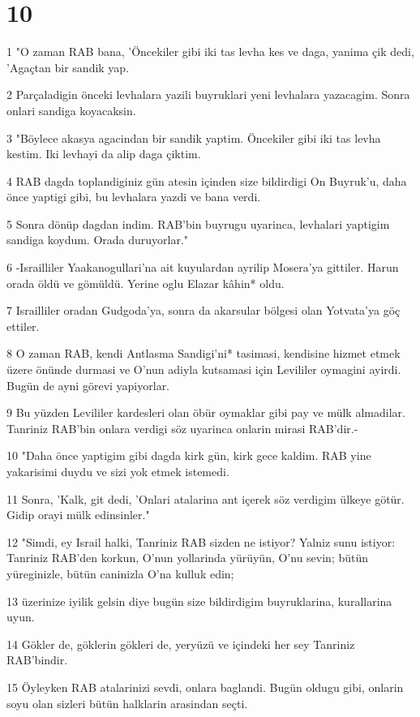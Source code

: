 \chapter{10}

\par 1 "O zaman RAB bana, 'Öncekiler gibi iki tas levha kes ve daga, yanima çik dedi, 'Agaçtan bir sandik yap.
\par 2 Parçaladigin önceki levhalara yazili buyruklari yeni levhalara yazacagim. Sonra onlari sandiga koyacaksin.
\par 3 "Böylece akasya agacindan bir sandik yaptim. Öncekiler gibi iki tas levha kestim. Iki levhayi da alip daga çiktim.
\par 4 RAB dagda toplandiginiz gün atesin içinden size bildirdigi On Buyruk'u, daha önce yaptigi gibi, bu levhalara yazdi ve bana verdi.
\par 5 Sonra dönüp dagdan indim. RAB'bin buyrugu uyarinca, levhalari yaptigim sandiga koydum. Orada duruyorlar."
\par 6 -Israilliler Yaakanogullari'na ait kuyulardan ayrilip Mosera'ya gittiler. Harun orada öldü ve gömüldü. Yerine oglu Elazar kâhin* oldu.
\par 7 Israilliler oradan Gudgoda'ya, sonra da akarsular bölgesi olan Yotvata'ya göç ettiler.
\par 8 O zaman RAB, kendi Antlasma Sandigi'ni* tasimasi, kendisine hizmet etmek üzere önünde durmasi ve O'nun adiyla kutsamasi için Levililer oymagini ayirdi. Bugün de ayni görevi yapiyorlar.
\par 9 Bu yüzden Levililer kardesleri olan öbür oymaklar gibi pay ve mülk almadilar. Tanriniz RAB'bin onlara verdigi söz uyarinca onlarin mirasi RAB'dir.-
\par 10 "Daha önce yaptigim gibi dagda kirk gün, kirk gece kaldim. RAB yine yakarisimi duydu ve sizi yok etmek istemedi.
\par 11 Sonra, 'Kalk, git dedi, 'Onlari atalarina ant içerek söz verdigim ülkeye götür. Gidip orayi mülk edinsinler."
\par 12 "Simdi, ey Israil halki, Tanriniz RAB sizden ne istiyor? Yalniz sunu istiyor: Tanriniz RAB'den korkun, O'nun yollarinda yürüyün, O'nu sevin; bütün yüreginizle, bütün caninizla O'na kulluk edin;
\par 13 üzerinize iyilik gelsin diye bugün size bildirdigim buyruklarina, kurallarina uyun.
\par 14 Gökler de, göklerin gökleri de, yeryüzü ve içindeki her sey Tanriniz RAB'bindir.
\par 15 Öyleyken RAB atalarinizi sevdi, onlara baglandi. Bugün oldugu gibi, onlarin soyu olan sizleri bütün halklarin arasindan seçti.

